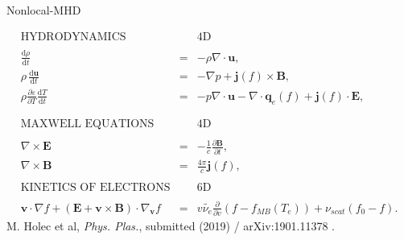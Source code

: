 \documentclass[8pt, compress]{beamer}
\newcommand{\vect}[1]{\boldsymbol{#1}}
\newcommand{\dI}{\text{d}}
\newcommand{\nue}{\nu_{e}}
\newcommand{\nuscat}{\nu_{scat}}
\newcommand{\E}{\vect{E}}
\newcommand{\fzero}{f_0}
\begin{document}
\begin{frame}
\begin{center}
{\huge Nonlocal-MHD}  

\begin{eqnarray}
  \text{HYDRODYNAMICS} && \text{4D} \nonumber \\
  && \nonumber \\
  \frac{\dI \rho}{\dI t} &=& - \rho\nabla\cdot\vect{u} , 
  \nonumber\\ 
  \rho\, \frac{\dI \vect{u}}{\dI t} &=& - \nabla p 
  + \vect{j}(f) \times \vect{B}, 
  \nonumber\\   
  \rho \frac{\partial \varepsilon}{\partial T}\frac{\dI T}{\dI t}
  &=& 
  - p \nabla\cdot\vect{u} - \nabla\cdot\vect{q}_e(f) 
  + \vect{j}(f)\cdot\E , 
  \nonumber \\
  && \nonumber \\
  && \nonumber \\
  \text{MAXWELL EQUATIONS} && \text{4D} \nonumber \\
  && \nonumber \\
  \nabla\times\vect{E} &=& -\frac{1}{c}\frac{\partial \vect{B}}{\partial t} ,
  \nonumber \\
  \nabla\times\vect{B} &=& \frac{4\pi}{c}
  \vect{j}(f) ,%
  \nonumber \\
  && \nonumber \\
  \text{KINETICS OF ELECTRONS} && \text{6D} \nonumber \\
  && \nonumber \\
  \vect{v}\cdot\nabla f +
  \left( \vect{E} + \vect{v}\times\vect{B}\right)\cdot\nabla_{\vect{v}} f
  &=& 
  v \tilde{\nue} \frac{\partial }{\partial v}\left(f - f_{MB}(T_e)\right)
  + \nuscat \left(\fzero - f \right) .
  \nonumber
\end{eqnarray}
{\small M. Holec et al, \textit{Phys. Plas.}, submitted (2019) / arXiv:1901.11378 .}
\end{center}
\end{frame}
\end{document}
